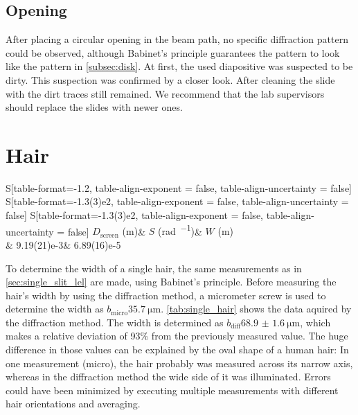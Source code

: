 \subsection*{Opening}
After placing a circular opening in the beam path, no specific diffraction pattern could be observed, although Babinet's principle guarantees the pattern to look like the pattern in \autoref{subsec:disk}.
At first, the used diapositive was suspected to be dirty.
This suspection was confirmed by a closer look.
After cleaning the slide with  the dirt traces still remained.
We recommend that the lab supervisors should replace the slides with newer ones.

\section{Hair}
\begin{table}[b!]
	\centering
	\caption{Single hair width}
	\label{tab:single_hair}
	\begin{tabular}{
	S[table-format=-1.2, table-align-exponent = false, table-align-uncertainty = false]
	S[table-format=-1.3(3)e2, table-align-exponent = false, table-align-uncertainty = false]
	S[table-format=-1.3(3)e2, table-align-exponent = false, table-align-uncertainty = false]
	}
		\toprule
		{$D_\text{screen}$ (\si{\meter})}&	{$S$ (\si{\radian\per\order})}&	{$W$ (\si{\meter})}\\
		&   9.19(21)e-3&    6.89(16)e-5\\
		\bottomrule
	\end{tabular}
\end{table}
To determine the width of a single hair, the same measurements as in \autoref{sec:single_slit_lel} are made, using Babinet's principle.
Before measuring the hair's width by using the diffraction method, a micrometer screw is used to determine the width as $b_\text{micro}\SI{35.7}{\micro\meter}$.
\autoref{tab:single_hair} shows the data aquired by the diffraction method.
The width is determined as $b_\text{diff}\SI{68.9(16)}{\micro\meter}$, which makes a relative deviation of \num{93}\% from the previously measured value.
The huge difference in those values can be explained by the oval shape of a human hair:
In one measurement (micro), the hair probably was measured across its narrow axis, whereas in the diffraction method the wide side of it was illuminated.
Errors could have been minimized by executing multiple measurements with different hair orientations and averaging.
